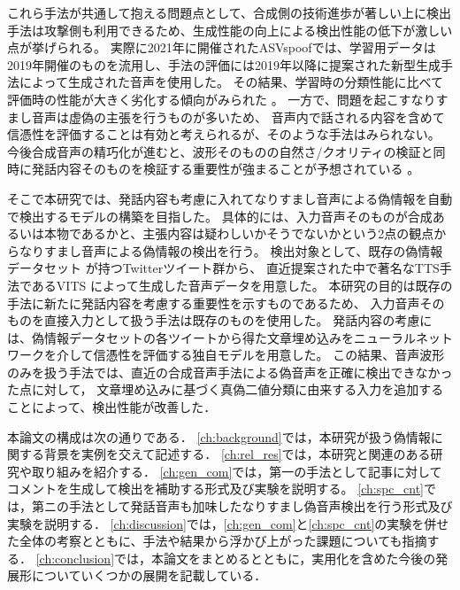 これら手法が共通して抱える問題点として、合成側の技術進歩が著しい上に検出手法は攻撃側も利用できるため、生成性能の向上による検出性能の低下が激しい点が挙げられる。
実際に2021年に開催されたASVspoofでは、学習用データは2019年開催のものを流用し、手法の評価には2019年以降に提案された新型生成手法によって生成された音声を使用した。
その結果、学習時の分類性能に比べて評価時の性能が大きく劣化する傾向がみられた \cite{yamagishi21_asvspoof,yu_icmece}。
一方で、問題を起こすなりすまし音声は虚偽の主張を行うものが多いため、
音声内で話される内容を含めて信憑性を評価することは有効と考えられるが、そのような手法はみられない。
今後合成音声の精巧化が進むと、波形そのものの自然さ/クオリティの検証と同時に発話内容そのものを検証する重要性が強まることが予想されている \cite{10208955}。

そこで本研究では、発話内容も考慮に入れてなりすまし音声による偽情報を自動で検出するモデルの構築を目指した。
具体的には、入力音声そのものが合成あるいは本物であるかと、主張内容は疑わしいかそうでないかという2点の観点からなりすまし音声による偽情報の検出を行う。
検出対象として、既存の偽情報データセット \cite{10.1145/3477495.3531744}が持つTwitterツイート群から、
直近提案された中で著名なTTS手法であるVITS \cite{pmlr-v139-kim21f}によって生成した音声データを用意した。
本研究の目的は既存の手法に新たに発話内容を考慮する重要性を示すものであるため、
入力音声そのものを直接入力として扱う手法は既存のものを使用した。
発話内容の考慮には、偽情報データセットの各ツイートから得た文章埋め込みをニューラルネットワークを介して信憑性を評価する独自モデルを用意した。
この結果、音声波形のみを扱う手法では、直近の合成音声手法による偽音声を正確に検出できなかった点に対して，
文章埋め込みに基づく真偽二値分類に由来する入力を追加することによって、検出性能が改善した．


本論文の構成は次の通りである．
\cref{ch:background}では，本研究が扱う偽情報に関する背景を実例を交えて記述する．
\cref{ch:rel_res}では，本研究と関連のある研究や取り組みを紹介する．
\cref{ch:gen_com}では，第一の手法として記事に対してコメントを生成して検出を補助する形式及び実験を説明する。
\cref{ch:spc_cnt}では，第ニの手法として発話音声も加味したなりすまし偽音声検出を行う形式及び実験を説明する．
\cref{ch:discussion}では，\cref{ch:gen_com}と\cref{ch:spc_cnt}の実験を併せた全体の考察とともに、手法や結果から浮かび上がった課題についても指摘する．
\cref{ch:conclusion}では，本論文をまとめるとともに，実用化を含めた今後の発展形についていくつかの展開を記載している．